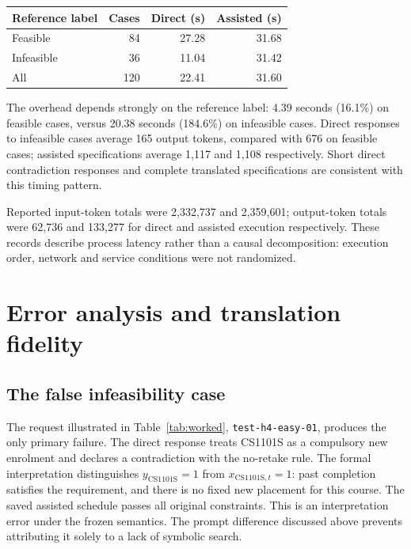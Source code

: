 \documentclass[11pt,a4paper]{article}
\newcommand{\code}[1]{\texttt{#1}}
\begin{document}
\begin{center}
\begin{minipage}{\linewidth}
\centering
{}
\label{tab:runtime}
\begin{tabular}{@{}lrrr@{}}
\toprule
Reference label & Cases & Direct (s) & Assisted (s)\\
\midrule
Feasible & 84 & 27.28 & 31.68\\
Infeasible & 36 & 11.04 & 31.42\\
All & 120 & 22.41 & 31.60\\
\bottomrule
\end{tabular}
\end{minipage}
\end{center}

The overhead depends strongly on the reference label: 4.39 seconds
(16.1\%) on feasible cases, versus 20.38 seconds (184.6\%) on infeasible
cases. Direct responses to infeasible cases average 165 output tokens,
compared with 676 on feasible cases; assisted specifications average
1,117 and 1,108 respectively. Short direct contradiction responses and
complete translated specifications are consistent with this timing pattern.

Reported input-token totals were 2,332,737 and 2,359,601; output-token totals
were 62,736 and 133,277 for direct and assisted execution respectively.
These records describe process latency rather than a causal decomposition:
execution order, network and service conditions were not randomized.

\par
\section{Error analysis and translation fidelity}
\subsection{The false infeasibility case}
\label{sec:false-infeasibility}
The request illustrated in Table~\ref{tab:worked},
\code{test-h4-easy-01}, produces the only primary failure. The direct response treats CS1101S
as a compulsory new enrolment and declares a contradiction with the
no-retake rule. The formal interpretation distinguishes
$y_{\mathrm{CS1101S}}=1$ from $x_{\mathrm{CS1101S},t}=1$: past completion
satisfies the requirement, and there is no fixed new placement for this
course. The saved assisted schedule passes all original constraints.
This is an interpretation error under the frozen semantics. The prompt
difference discussed above prevents attributing it solely to a lack of
symbolic search.
\end{document}
